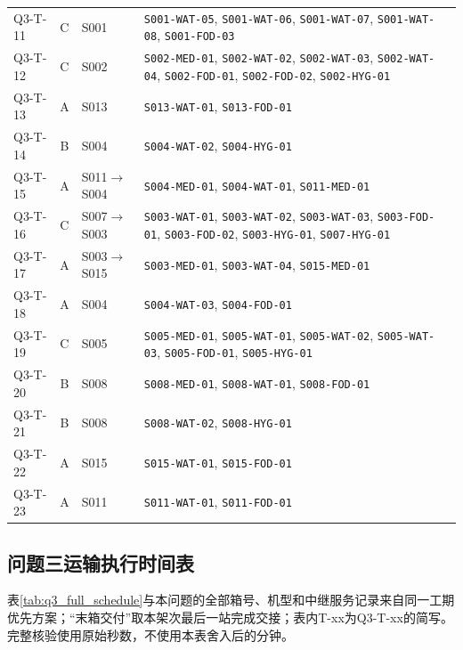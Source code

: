 \documentclass[withoutpreface,colorprint]{format}
\numberwithin{equation}{section}
\numberwithin{figure}{section}
\numberwithin{table}{section}
\begin{document}
\begin{longtable}{@{}lc>{\raggedright\arraybackslash}p{2.8cm}>{\raggedright\arraybackslash}p{8.8cm}@{}}
Q3-T-11 & C & S001 & \texttt{S001-WAT-05}\allowbreak, \texttt{S001-WAT-06}\allowbreak, \texttt{S001-WAT-07}\allowbreak, \texttt{S001-WAT-08}\allowbreak, \texttt{S001-FOD-03}\allowbreak\\
Q3-T-12 & C & S002 & \texttt{S002-MED-01}\allowbreak, \texttt{S002-WAT-02}\allowbreak, \texttt{S002-WAT-03}\allowbreak, \texttt{S002-WAT-04}\allowbreak, \texttt{S002-FOD-01}\allowbreak, \texttt{S002-FOD-02}\allowbreak, \texttt{S002-HYG-01}\allowbreak\\
Q3-T-13 & A & S013 & \texttt{S013-WAT-01}\allowbreak, \texttt{S013-FOD-01}\allowbreak\\
Q3-T-14 & B & S004 & \texttt{S004-WAT-02}\allowbreak, \texttt{S004-HYG-01}\allowbreak\\
Q3-T-15 & A & S011$\to$S004 & \texttt{S004-MED-01}\allowbreak, \texttt{S004-WAT-01}\allowbreak, \texttt{S011-MED-01}\allowbreak\\
Q3-T-16 & C & S007$\to$S003 & \texttt{S003-WAT-01}\allowbreak, \texttt{S003-WAT-02}\allowbreak, \texttt{S003-WAT-03}\allowbreak, \texttt{S003-FOD-01}\allowbreak, \texttt{S003-FOD-02}\allowbreak, \texttt{S003-HYG-01}\allowbreak, \texttt{S007-HYG-01}\allowbreak\\
Q3-T-17 & A & S003$\to$S015 & \texttt{S003-MED-01}\allowbreak, \texttt{S003-WAT-04}\allowbreak, \texttt{S015-MED-01}\allowbreak\\
Q3-T-18 & A & S004 & \texttt{S004-WAT-03}\allowbreak, \texttt{S004-FOD-01}\allowbreak\\
Q3-T-19 & C & S005 & \texttt{S005-MED-01}\allowbreak, \texttt{S005-WAT-01}\allowbreak, \texttt{S005-WAT-02}\allowbreak, \texttt{S005-WAT-03}\allowbreak, \texttt{S005-FOD-01}\allowbreak, \texttt{S005-HYG-01}\allowbreak\\
Q3-T-20 & B & S008 & \texttt{S008-MED-01}\allowbreak, \texttt{S008-WAT-01}\allowbreak, \texttt{S008-FOD-01}\allowbreak\\
Q3-T-21 & B & S008 & \texttt{S008-WAT-02}\allowbreak, \texttt{S008-HYG-01}\allowbreak\\
Q3-T-22 & A & S015 & \texttt{S015-WAT-01}\allowbreak, \texttt{S015-FOD-01}\allowbreak\\
Q3-T-23 & A & S011 & \texttt{S011-WAT-01}\allowbreak, \texttt{S011-FOD-01}\allowbreak\\
\bottomrule
\end{longtable}


\subsection{问题三运输执行时间表}
表\ref{tab:q3_full_schedule}与本问题的全部箱号、机型和中继服务记录来自同一工期优先方案；“末箱交付”取本架次最后一站完成交接；表内T-xx为Q3-T-xx的简写。完整核验使用原始秒数，不使用本表舍入后的分钟。
\end{document}

